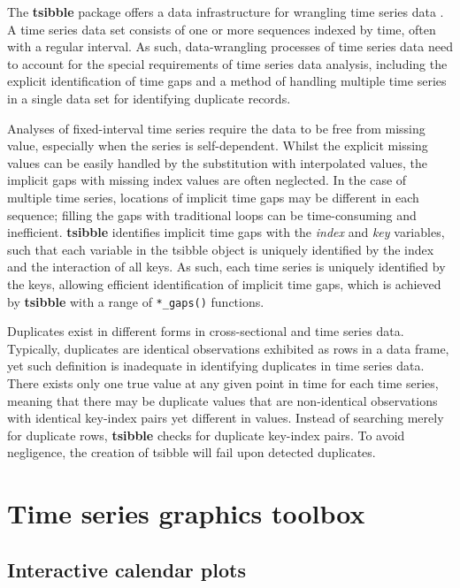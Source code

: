 \documentclass{aucklandthesis}
\begin{document}
The \textbf{tsibble} package offers a data infrastructure for wrangling time series data \autocite{tsibble}. A time series data set consists of one or more sequences indexed by time, often with a regular interval. As such, data-wrangling processes of time series data need to account for the special requirements of time series data analysis, including the explicit identification of time gaps and a method of handling multiple time series in a single data set for identifying duplicate records.

Analyses of fixed-interval time series require the data to be free from missing value, especially when the series is self-dependent. Whilst the explicit missing values can be easily handled by the substitution with interpolated values, the implicit gaps with missing index values are often neglected. In the case of multiple time series, locations of implicit time gaps may be different in each sequence; filling the gaps with traditional loops can be time-consuming and inefficient. \textbf{tsibble} identifies implicit time gaps with the \emph{index} and \emph{key} variables, such that each variable in the tsibble object is uniquely identified by the index and the interaction of all keys. As such, each time series is uniquely identified by the keys, allowing efficient identification of implicit time gaps, which is achieved by \textbf{tsibble} with a range of \texttt{*\_gaps()} functions.

Duplicates exist in different forms in cross-sectional and time series data. Typically, duplicates are identical observations exhibited as rows in a data frame, yet such definition is inadequate in identifying duplicates in time series data. There exists only one true value at any given point in time for each time series, meaning that there may be duplicate values that are non-identical observations with identical key-index pairs yet different in values. Instead of searching merely for duplicate rows, \textbf{tsibble} checks for duplicate key-index pairs. To avoid negligence, the creation of tsibble will fail upon detected duplicates.

\hypertarget{time-series-graphics-toolbox}{%
\section{Time series graphics toolbox}\label{time-series-graphics-toolbox}}

\hypertarget{interactive-calendar-plots}{%
\subsection{Interactive calendar plots}\label{interactive-calendar-plots}}
\end{document}
